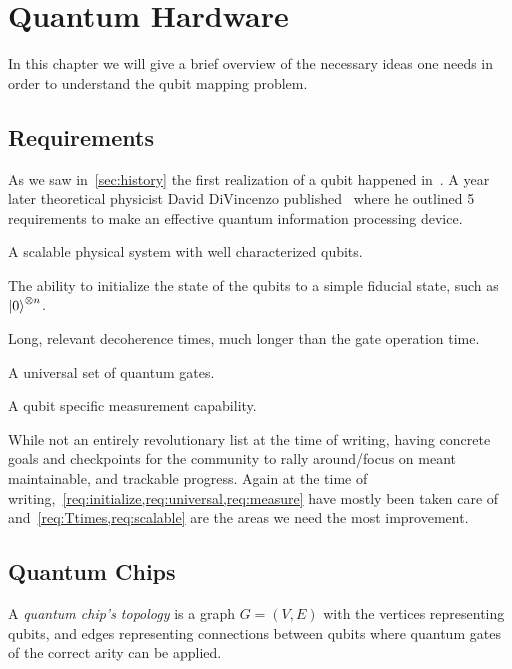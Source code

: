 \chapter{Quantum Hardware}\label{ch:hardware}

In this chapter we will give a brief overview of the necessary ideas one needs in order to understand the qubit mapping problem.

\section{Requirements}
As we saw in~\cref{sec:history} the first realization of a qubit happened in~\citeyear{firstqubit}.
A year later theoretical physicist David DiVincenzo published~\cite{divincenzo} where he outlined 5 requirements to make an effective quantum information processing device.
\begin{requirements}
    \item A scalable physical system with well characterized qubits.\label{req:scalable}
    \item The ability to initialize the state of the qubits to a simple fiducial state, such as $\ket{0}^{\otimes n}$.\label{req:initialize}
    \item Long, relevant decoherence times, much longer than the gate operation time.\label{req:Ttimes}
    \item A universal set of quantum gates.\label{req:universal}
    \item A qubit specific measurement capability.\label{req:measure}
\end{requirements}
While not an entirely revolutionary list at the time of writing, having concrete goals and checkpoints for the community to rally around/focus on meant maintainable, and trackable progress.
Again at the time of writing,~\cref{req:initialize,req:universal,req:measure} have mostly been taken care of and~\cref{req:Ttimes,req:scalable} are the areas we need the most improvement.

\section{Quantum Chips}

\begin{definition}
    A \emph{quantum chip's topology} is a graph $G = (V, E)$ with the vertices representing qubits, and edges representing connections between qubits where quantum gates of the correct arity can be applied.
\end{definition}

